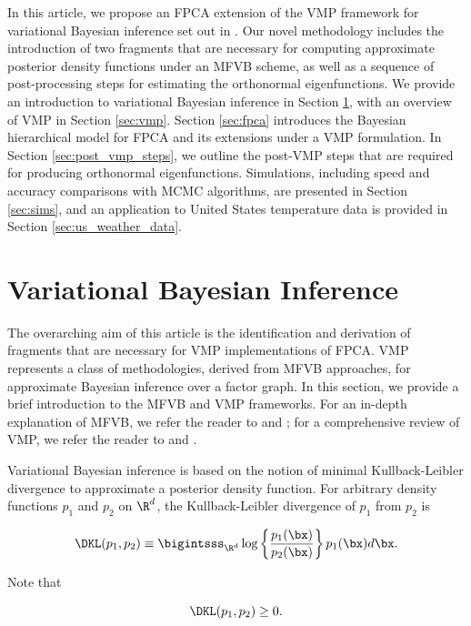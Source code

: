 \documentclass[12pt]{article}
\theoremstyle{plain}
\theoremstyle{definition}
\theoremstyle{remark}
\begin{document}
In this article, we propose an FPCA extension of the VMP framework for variational Bayesian inference set out in
. Our novel methodology includes the introduction of two fragments  that are necessary for
computing approximate posterior density functions under an MFVB scheme,
as well as a sequence of post-processing steps for estimating the orthonormal eigenfunctions.
We provide an introduction to
variational Bayesian inference in Section \ref{sec:vbi}, with an overview of VMP in Section \ref{sec:vmp}.
Section \ref{sec:fpca} introduces the Bayesian hierarchical model for FPCA and its extensions under a
VMP formulation. In Section \ref{sec:post_vmp_steps}, we outline the post-VMP steps that are required for
producing orthonormal eigenfunctions. Simulations, including speed and accuracy comparisons with MCMC
algorithms, are presented in Section \ref{sec:sims}, and an application to United States temperature data is
provided in Section \ref{sec:us_weather_data}.


\section{Variational Bayesian Inference}
\label{sec:vbi}

The overarching aim of this article is the identification and derivation of fragments that are necessary for VMP
implementations of FPCA. VMP represents a class of methodologies, derived from MFVB approaches,
for approximate Bayesian inference over a factor graph.
In this section, we provide a brief introduction to the MFVB and VMP frameworks. For an in-depth
explanation of MFVB, we refer the reader to  and ; for a comprehensive review
of VMP, we refer the reader to  and .

Variational Bayesian inference is based on the notion of minimal Kullback-Leibler divergence to approximate a
posterior density function. For arbitrary density functions $p_1$
and $p_2$ on $\R^d$, the Kullback-Leibler divergence of $p_1$ from $p_2$ is

\[
	\DKL (p_1, p_2) \equiv \bigintsss_{\R^d} \log \left\{ \frac{p_1 (\bx)}{p_2 (\bx)} \right\} p_1 (\bx) d\bx.
\]

\noindent Note that

\begin{equation}
	\DKL (p_1, p_2) \ge 0.
\label{nonneg_dkl}
\end{equation}
\end{document}
